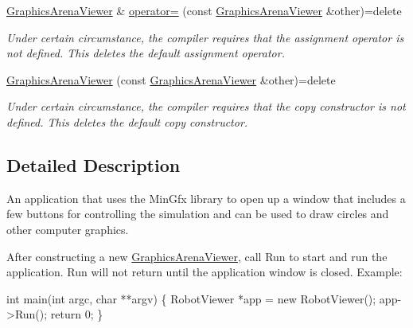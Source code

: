 \begin{DoxyCompactItemize}
\mbox{\label{class_graphics_arena_viewer_a289278f7b338fc60f983827d21b159ff}} 
\mbox{\hyperlink{class_graphics_arena_viewer}{Graphics\+Arena\+Viewer}} \& \mbox{\hyperlink{class_graphics_arena_viewer_a289278f7b338fc60f983827d21b159ff}{operator=}} (const \mbox{\hyperlink{class_graphics_arena_viewer}{Graphics\+Arena\+Viewer}} \&other)=delete
\begin{DoxyCompactList}\small\item\em Under certain circumstance, the compiler requires that the assignment operator is not defined. This {\ttfamily deletes} the default assignment operator. \end{DoxyCompactList}\item 
\mbox{\label{class_graphics_arena_viewer_afa70b72e0769db0f3f41fe37bc540621}} 
\mbox{\hyperlink{class_graphics_arena_viewer_afa70b72e0769db0f3f41fe37bc540621}{Graphics\+Arena\+Viewer}} (const \mbox{\hyperlink{class_graphics_arena_viewer}{Graphics\+Arena\+Viewer}} \&other)=delete
\begin{DoxyCompactList}\small\item\em Under certain circumstance, the compiler requires that the copy constructor is not defined. This {\ttfamily deletes} the default copy constructor. \end{DoxyCompactList}\end{DoxyCompactItemize}


\subsection{Detailed Description}
An application that uses the Min\+Gfx library to open up a window that includes a few buttons for controlling the simulation and can be used to draw circles and other computer graphics. 

After constructing a new \mbox{\hyperlink{class_graphics_arena_viewer}{Graphics\+Arena\+Viewer}}, call Run to start and run the application. Run will not return until the application window is closed. Example\+:


\begin{DoxyCode}
\textcolor{keywordtype}{int} main(\textcolor{keywordtype}{int} argc, \textcolor{keywordtype}{char} **argv) \{
    RobotViewer *app = \textcolor{keyword}{new} RobotViewer();
    app->Run();
    \textcolor{keywordflow}{return} 0;
\}
\end{DoxyCode}


